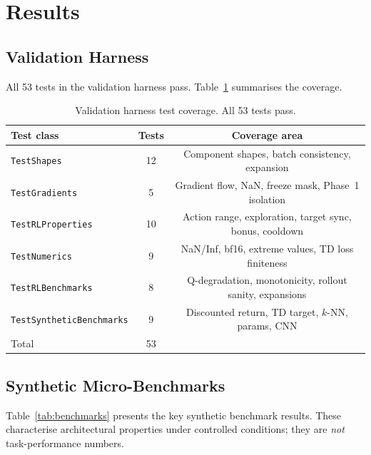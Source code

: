 \documentclass{article}
\begin{document}
\section{Results}
\label{sec:results}

\subsection{Validation Harness}

All 53 tests in the validation harness pass. Table~\ref{tab:tests} summarises
the coverage.

\begin{table}[h]
  \centering
  \caption{Validation harness test coverage. All 53 tests pass.}
  \label{tab:tests}
  \begin{tabular}{lcc}
    \toprule
    \textbf{Test class} & \textbf{Tests} & \textbf{Coverage area} \\
    \midrule
    \texttt{TestShapes} & 12 & Component shapes, batch consistency, expansion \\
    \texttt{TestGradients} & 5 & Gradient flow, NaN, freeze mask, Phase~1 isolation \\
    \texttt{TestRLProperties} & 10 & Action range, exploration, target sync, bonus, cooldown \\
    \texttt{TestNumerics} & 9 & NaN/Inf, bf16, extreme values, TD loss finiteness \\
    \texttt{TestRLBenchmarks} & 8 & Q-degradation, monotonicity, rollout sanity, expansions \\
    \texttt{TestSyntheticBenchmarks} & 9 & Discounted return, TD target, $k$-NN, params, CNN \\
    \midrule
    Total & 53 & \\
    \bottomrule
  \end{tabular}
\end{table}

\subsection{Synthetic Micro-Benchmarks}

Table~\ref{tab:benchmarks} presents the key synthetic benchmark results. These
characterise architectural properties under controlled conditions; they are
\emph{not} task-performance numbers.
\end{document}
